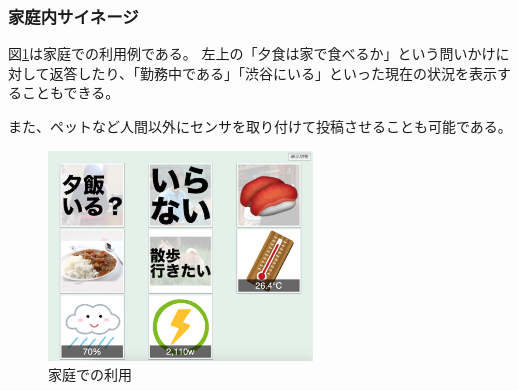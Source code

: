 \subsubsection{家庭内サイネージ}

図\ref{home}は家庭での利用例である。
左上の「夕食は家で食べるか」という問いかけに対して返答したり、「勤務中である」「渋谷にいる」といった現在の状況を表示することもできる。

また、ペットなど人間以外にセンサを取り付けて投稿させることも可能である。

\begin{figure}[h]
\centering
\includegraphics[width=7cm]{images/home.eps}
\caption{家庭での利用}
\label{home}
\end{figure}